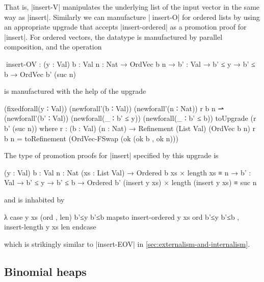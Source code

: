 That is, |insert-V| manipulates the underlying list of the input vector in the same way as |insert|.
Similarly we can manufacture |^^^insert-O| for ordered lists by using an appropriate upgrade that accepts |insert-ordered| as a promotion proof for |insert|.
For ordered vectors, the datatype is manufactured by parallel composition, and the operation
\begin{code}
^^^insert-OV :  (y : Val) {b : Val} {n : Nat} → OrdVec b n →
                {b' : Val} → b' ≤ y → b' ≤ b → OrdVec b' (suc n)
\end{code}
is manufactured with the help of the upgrade
\begin{code}
(fixedforall(y ∶ Val)) (newforall'(b ∶ Val)) (newforall'(n ∶ Nat)) r b n ⇀
(newforall'(b' ∶ Val)) (newforall(_ ∶ b' ≤ y)) (newforall(_ ∶ b' ≤ b)) toUpgrade (r b' (suc n))
where
  r : (b : Val) (n : Nat) → Refinement (List Val) (OrdVec b n)
  r b n = toRefinement (OrdVec-FSwap (ok (ok b , ok n)))
\end{code}
The type of promotion proofs for |insert| specified by this upgrade is
\begin{code}
(y : Val) {b : Val} {n : Nat} (xs : List Val) →
  Ordered b xs × length xs ≡ n →
{b' : Val} → b' ≤ y → b' ≤ b →
  Ordered b' (insert y xs) × length (insert y xs) ≡ suc n
\end{code}
and is inhabited by
\begin{code}
λ case y xs (ord , len) b'≤y b'≤b mapsto  insert-ordered  y xs ord b'≤y b'≤b ,
                                          insert-length   y xs len endcase
\end{code}
which is strikingly similar to |insert-EOV| in \autoref{sec:externalism-and-internalism}.

\subsection{Binomial heaps}
\label{sec:binomial-heaps}

